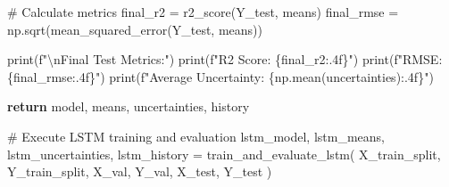 \documentclass[
  letterpaper,
  DIV=11,
  numbers=noendperiod]{scrreprt}
\newenvironment{Shaded}{\begin{snugshade}}{\end{snugshade}}
\newcommand{\BuiltInTok}[1]{\textcolor[rgb]{0.00,0.23,0.31}{#1}}
\newcommand{\CharTok}[1]{\textcolor[rgb]{0.13,0.47,0.30}{#1}}
\newcommand{\CommentTok}[1]{\textcolor[rgb]{0.37,0.37,0.37}{#1}}
\newcommand{\ControlFlowTok}[1]{\textcolor[rgb]{0.00,0.23,0.31}{\textbf{#1}}}
\newcommand{\NormalTok}[1]{\textcolor[rgb]{0.00,0.23,0.31}{#1}}
\newcommand{\OperatorTok}[1]{\textcolor[rgb]{0.37,0.37,0.37}{#1}}
\newcommand{\SpecialCharTok}[1]{\textcolor[rgb]{0.37,0.37,0.37}{#1}}
\newcommand{\SpecialStringTok}[1]{\textcolor[rgb]{0.13,0.47,0.30}{#1}}
\begin{document}
\begin{Shaded}
\begin{Highlighting}[]
    \CommentTok{\# Calculate metrics}
\NormalTok{    final\_r2 }\OperatorTok{=}\NormalTok{ r2\_score(Y\_test, means)}
\NormalTok{    final\_rmse }\OperatorTok{=}\NormalTok{ np.sqrt(mean\_squared\_error(Y\_test, means))}

    \BuiltInTok{print}\NormalTok{(}\SpecialStringTok{f"}\CharTok{\textbackslash{}n}\SpecialStringTok{Final Test Metrics:"}\NormalTok{)}
    \BuiltInTok{print}\NormalTok{(}\SpecialStringTok{f"R2 Score: }\SpecialCharTok{\{}\NormalTok{final\_r2}\SpecialCharTok{:.4f\}}\SpecialStringTok{"}\NormalTok{)}
    \BuiltInTok{print}\NormalTok{(}\SpecialStringTok{f"RMSE: }\SpecialCharTok{\{}\NormalTok{final\_rmse}\SpecialCharTok{:.4f\}}\SpecialStringTok{"}\NormalTok{)}
    \BuiltInTok{print}\NormalTok{(}\SpecialStringTok{f"Average Uncertainty: }\SpecialCharTok{\{}\NormalTok{np}\SpecialCharTok{.}\NormalTok{mean(uncertainties)}\SpecialCharTok{:.4f\}}\SpecialStringTok{"}\NormalTok{)}

    \ControlFlowTok{return}\NormalTok{ model, means, uncertainties, history}

\CommentTok{\# Execute LSTM training and evaluation}
\NormalTok{lstm\_model, lstm\_means, lstm\_uncertainties, lstm\_history }\OperatorTok{=}\NormalTok{ train\_and\_evaluate\_lstm(}
\NormalTok{    X\_train\_split, Y\_train\_split,}
\NormalTok{    X\_val, Y\_val,}
\NormalTok{    X\_test, Y\_test}
\NormalTok{)}
\end{Highlighting}
\end{Shaded}
\end{document}
